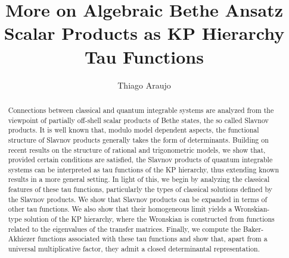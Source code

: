 \documentclass[a4paper,11pt]{amsart}
\begin{document}

\title[Slavnov products, KP and BA functions]{More on Algebraic Bethe
  Ansatz Scalar Products as KP Hierarchy Tau Functions}

\author{Thiago Araujo}

\address{
Universidade Federal Fluminense,\\ 
Instituto de Ciências Exatas, Departamento de Física\\
Volta Redonda, RJ, Brazil}


\begin{abstract}
 Connections between classical and quantum integrable systems are
 analyzed from the viewpoint of partially off-shell scalar products of
 Bethe states, the so called Slavnov products. It is well known that,
 modulo model dependent aspects, the functional structure of Slavnov
 products generally takes the form of determinants. Building on recent
 results on the structure of rational and trigonometric models, we
 show that, provided certain conditions are satisfied, the Slavnov
 products of quantum integrable systems can be interpreted as tau
 functions of the KP hierarchy, thus extending known results in a more
 general setting.  In light of this, we begin by analyzing the
 classical features of these tau functions, particularly the types of
 classical solutions defined by the Slavnov products. We show that
 Slavnov products can be expanded in terms of other tau functions.  We
 also show that their homogeneous limit yields a Wronskian-type
 solution of the KP hierarchy, where the Wronskian is constructed from
 functions related to the eigenvalues of the transfer matrices.
 Finally, we compute the Baker-Akhiezer functions associated with
 these tau functions and show that, apart from a universal
 multiplicative factor, they admit a closed determinantal
 representation.
\end{abstract}

\end{document}
